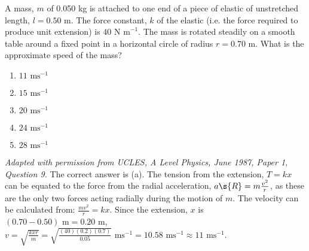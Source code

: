 
\begin{problem}[A1987PIQ9l] 
{A mass, $m$ of 0.050 kg is attached to one end of a piece of elastic of unstretched length, $l = 0.50 \textrm{ m}$. The force constant, $k$ of the elastic (i.e. the force required to produce unit extension) is $40 \textrm{ N m}^{-1}$. The mass is rotated steadily on a smooth table around a fixed point in a horizontal circle of radius $r =0.70 \textrm{ m}$.
What is the approximate speed of the mass?
\begin{enumerate}
	\item $11 \textrm{ ms}^{-1}$ \answer
	\item $15 \textrm{ ms}^{-1}$
	\item $20 \textrm{ ms}^{-1}$
	\item $24 \textrm{ ms}^{-1}$
	\item $28 \textrm{ ms}^{-1}$
\end{enumerate}}
{\textit{Adapted with permission from UCLES, A Level Physics, June 1987, Paper 1, Question 9.}}
{The correct answer is (a). The tension from the extension, $T = kx$ can be equated to the force from the radial acceleration, $a\s{R} = m\frac{v^{2}}{r}$, as these are the only two forces acting radially during the motion of $m$. The velocity can be calculated from: $\frac{mv^{2}}{r} = kx$. Since the extension, $x$ is $(0.70 - 0.50) \textrm{ m} = 0.20 \textrm{ m}$, $v = \sqrt{\frac{kxr}{m}} = \sqrt{\frac{(40)(0.2)(0.7)}{0.05}} \textrm{ ms}^{-1}= 10.58 \textrm{ ms}^{-1} \approx 11 \textrm{ ms}^{-1}$.}
\end{problem}